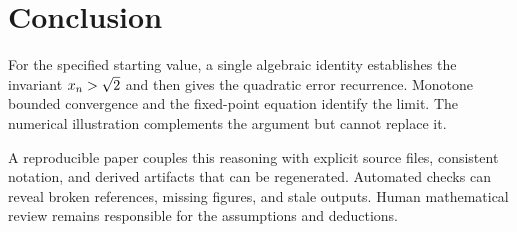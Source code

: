 \section{Conclusion}\label{sec:conclusion}
For the specified starting value, a single algebraic identity establishes the
invariant $x_n>\sqrt{2}$ and then gives the quadratic error recurrence. Monotone
bounded convergence and the fixed-point equation identify the limit. The
numerical illustration complements the argument but cannot replace it.

A reproducible paper couples this reasoning with explicit source files,
consistent notation, and derived artifacts that can be regenerated. Automated
checks can reveal broken references, missing figures, and stale outputs. Human
mathematical review remains responsible for the assumptions and deductions.
